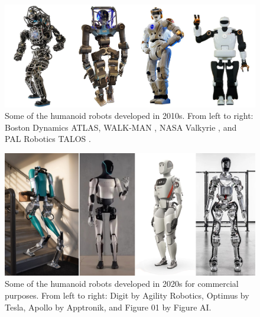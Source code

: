 \begin{figure}
    \centering
    \includegraphics[width=\textwidth]{figures/01-introduction/robots-in-2010.jpg}
    \caption{Some of the humanoid robots developed in 2010s. From left to right:
        Boston Dynamics ATLAS,
        WALK-MAN \cite{Tsagarakis2017WALKMAN},
        NASA Valkyrie \cite{Radford2015Valkyrie}, and
        PAL Robotics TALOS \cite{Stasse2017TALOS}.}
    \label{fig:introduction:robots-in-2010}
\end{figure}

\begin{figure}
    \centering
    \includegraphics[width=\textwidth]{figures/01-introduction/robots-in-2020.jpg}
    \caption{Some of the humanoid robots developed in 2020s for commercial
        purposes. From left to right:
        Digit by Agility Robotics, Optimus by Tesla, Apollo by Apptronik, and
        Figure 01 by Figure AI.
    }
    \label{fig:introduction:robots-in-2020}
\end{figure}

